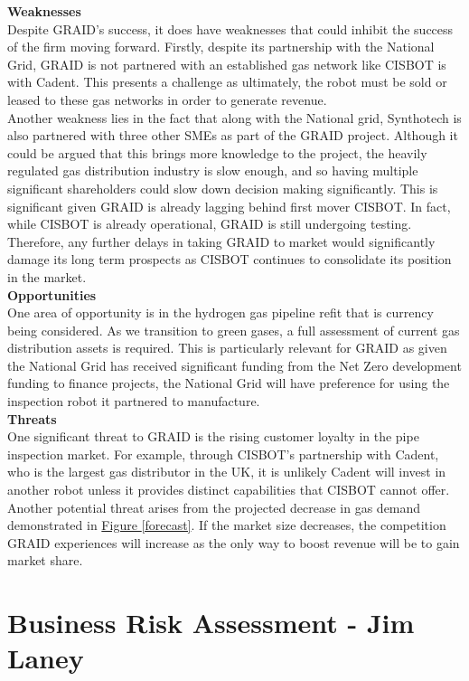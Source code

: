 \documentclass[11pt]{article}		%
\newcommand{\figref}[1]{\hyperref[#1]{Figure \ref*{#1}}}    %
\begin{document}
	        \textbf{Weaknesses}\\
	        Despite GRAID’s success, it does have weaknesses that could inhibit the success of the firm moving forward. Firstly, despite its partnership with the National Grid, GRAID is not partnered with an established gas network like CISBOT is with Cadent. This presents a challenge as ultimately, the robot must be sold or leased to these gas networks in order to generate revenue. \\
	        \hspace*{3ex}Another weakness lies in the fact that along with the National grid, Synthotech is also partnered with three other SMEs as part of the GRAID project. Although it could be argued that this brings more knowledge to the project, the heavily regulated gas distribution industry is slow enough, and so having multiple significant shareholders could slow down decision making significantly. This is significant given GRAID is already lagging behind first mover CISBOT. In fact, while CISBOT is already operational, GRAID is still undergoing testing. Therefore, any further delays in taking GRAID to market would significantly damage its long term prospects as CISBOT continues to consolidate its position in the market. \\
	        \textbf{Opportunities}\\
	        One area of opportunity is in the hydrogen gas pipeline refit that is currency being considered. As we transition to green gases, a full assessment of current gas distribution assets is required. This is particularly relevant for GRAID as given the National Grid has received significant funding from the Net Zero development funding to finance projects, the National Grid will have preference for using the inspection robot it partnered to manufacture. \\
	        \textbf{Threats} \\
	        One significant threat to GRAID is the rising customer loyalty in the pipe inspection market. For example, through CISBOT's partnership with Cadent, who is the largest gas distributor in the UK, it is unlikely Cadent will invest in another robot unless it provides distinct capabilities that CISBOT cannot offer. Another potential threat arises from the projected decrease in gas demand demonstrated in \figref{forecast}. If the market size decreases, the competition GRAID experiences will increase as the only way to boost revenue will be to gain market share.
	        
     \section[Business Risk Assessment - EEM]{Business Risk Assessment - Jim Laney}
     	
\end{document}
